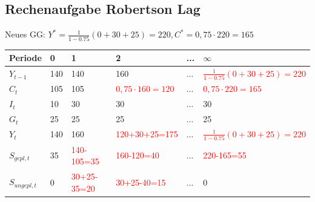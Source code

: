 \documentclass{scrartcl}
\begin{document}
\subsection{Rechenaufgabe Robertson Lag}
Neues GG: $Y^* = \frac{1}{1-0.75}(0+30+25) = 220, C^* = 0,75\cdot220=165$
\begin{center}
\begin{tabular}{|l|l|l|l|l|l|}
\hline
Periode        & 0   & 1                            & 2                                    & ... & $\infty$ \\ \hline
$Y_{t-1}$      & 140 & 140                          & 160                                  & ... & \textcolor{red}{$\frac{1}{1-0.75}(0+30+25) = 220$}         \\ \hline
$C_t$          & 105 & 105                          & \textcolor{red}{$0,75\cdot160 =120$} & ... & \textcolor{red}{$0,75\cdot220=165$}         \\ \hline
$I_{t}$        & 10  & 30                           & 30                                   & ... & 30       \\ \hline
$G_t$          & 25  & 25                           & 25                                   & ... & 25       \\ \hline
$Y_t$          & 140 & 160                          & \textcolor{red}{120+30+25=175}       & ... & \textcolor{red}{$\frac{1}{1-0.75}(0+30+25) = 220$}          \\ \hline
$S_{gepl,t}$   & 35  & \textcolor{red}{140-105=35}  & \textcolor{red}{160-120=40}          & ... & \textcolor{red}{220-165=55}         \\ \hline
$S_{ungepl,t}$ & 0   & \textcolor{red}{30+25-35=20} & \textcolor{red}{30+25-40=15}         & ... & 0        \\ \hline
\end{tabular}
\end{center}
\end{document}
